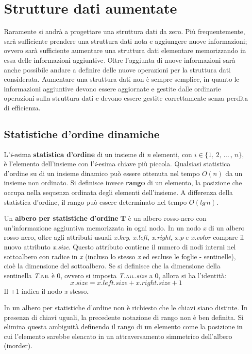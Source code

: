 \documentclass[10pt, a4paper]{report}
\begin{document}
\chapter{Strutture dati aumentate}
Raramente si andrà a progettare una struttura dati da zero. Più frequentemente, sarà sufficiente prendere una struttura dati nota e aggiungere nuove informazioni; ovvero sarà sufficiente aumentare una struttura dati elementare memorizzando in essa delle informazioni aggiuntive. Oltre l'aggiunta di nuove informazioni sarà anche possibile andare a definire delle nuove operazioni per la struttura dati considerata. Aumentare una struttura dati non è sempre semplice, in quanto le informazioni aggiuntive devono essere aggiornate e gestite dalle ordinarie operazioni sulla struttura dati e devono essere gestite correttamente senza perdita di efficienza.
\section{Statistiche d'ordine dinamiche}
L'\textit{i}-esima \textbf{statistica d'ordine} di un insieme di \textit{n} elementi, con $i \in \{1,\,2,\,...\,,\,n\}$, è l'elemento dell'insieme con l'\textit{i}-esima chiave più piccola. Qualsiasi statistica d'ordine su di un insieme dinamico può essere ottenuta nel tempo $O(n)$ da un insieme non ordinato. Si definisce invece \textbf{rango} di un elemento, la posizione che occupa nella sequenza ordinata degli elementi dell'insieme. A differenza della statistica d'ordine, il rango può essere determinato nel tempo $O(lg\,n)$.

Un \textbf{albero per statistiche d'ordine} \textbf{T} è un albero rosso-nero con un'informazione aggiuntiva memorizzata in ogni nodo. In un nodo \textit{x} di un albero rosso-nero, oltre agli attributi usuali \textit{x.key}, \textit{x.left}, \textit{x.right}, \textit{x.p} e \textit{x.color} compare il nuovo attributo \textit{x.size}. Questo attributo contiene il numero di nodi interni nel sottoalbero con radice in \textit{x} (incluso lo stesso \textit{x} ed escluse le foglie - sentinelle), cioè la dimensione del sottoalbero. Se si definisce che la dimensione della sentinella \textit{T.}\textsc{nil} è 0, ovvero si imposta \textit{T.\textsc{nil}.size} a 0, allora si ha l'identità:
\begin{equation*}
x.size = x.left.size + x.right.size + 1
\end{equation*}
Il +1 indica il nodo \textit{x} stesso.

In un albero per statistiche d'ordine non è richiesto che le chiavi siano distinte. In presenza di chiavi uguali, la precedente notazione di rango non è ben definita. Si elimina questa ambiguità definendo il rango di un elemento come la posizione in cui l'elemento sarebbe elencato in un attraversamento simmetrico dell'albero (inorder).
\end{document}
